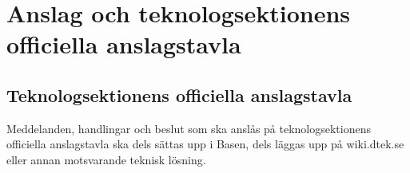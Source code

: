 \section{Anslag och teknologsektionens officiella anslagstavla}
\subsection{Teknologsektionens officiella anslagstavla}
Meddelanden, handlingar och beslut som ska anslås på teknologsektionens
officiella anslagstavla ska dels sättas upp i Basen, dels läggas upp på
wiki.dtek.se eller annan motsvarande teknisk lösning.